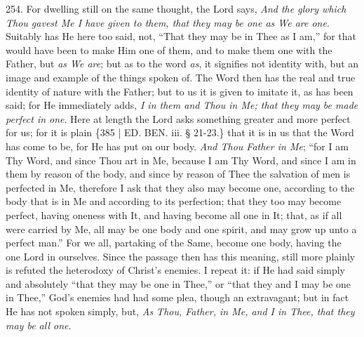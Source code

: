254. For
dwelling still on the same thought, the Lord says, \emph{And the glory
which Thou gavest Me I have given to them, that they may be one as We
are one}. Suitably has He here too said, not, ``That they may be in
Thee as I am,'' for that would have been to make Him one of them, and
to make them one with the Father, but \emph{as We are}; but as to the
word \emph{as}, it signifies not identity with, but an image and
example of the things spoken of. The Word then has the real and true
identity of nature with the Father; but to us it is given to imitate
it, as has been said; for He immediately adds, \emph{I in them and Thou
in Me; that they may be made perfect in one}. Here at length the
Lord asks something greater and more perfect for us; for it is plain
\{385 | ED.
BEN. iii. § 21-23.\} that it is in us that the
Word has come to be, for He has put on our body. \emph{And Thou Father in
Me}; ``for I am Thy Word, and since Thou art in Me, because I am Thy
Word, and since I am in them by reason of the body, and since by
reason of Thee the salvation of men is perfected in Me, therefore I
ask that they also may become one, according to the body that is in Me
and according to its perfection; that they too may become perfect,
having oneness with It, and having become all one in It; that, as if
all were carried by Me, all may be one body and one spirit, and may
grow up unto a perfect man.'' For we all, partaking of the Same, become
one body, having the one Lord in ourselves. Since the passage then has
this meaning, still more plainly is refuted the heterodoxy of Christ's
enemies. I repeat it: if He had said simply and absolutely ``that they may be one in Thee,'' or ``that they
and I may be one in Thee,'' God's
enemies had had some plea, though an extravagant; but in fact He has
not spoken simply, but, \emph{As Thou, Father, in Me, and I in Thee, that
they may be all one}.

